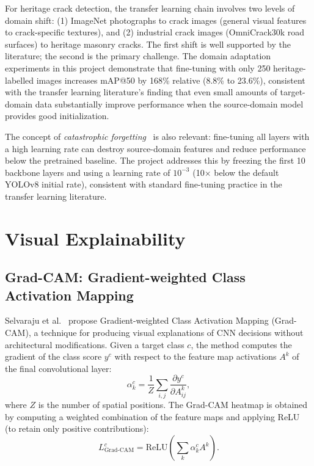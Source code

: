 \documentclass[12pt,a4paper]{article}
\begin{document}
For heritage crack detection, the transfer learning chain involves two levels of domain shift: (1) ImageNet photographs to crack images (general visual features to crack-specific textures), and (2) industrial crack images (OmniCrack30k road surfaces) to heritage masonry cracks. The first shift is well supported by the literature; the second is the primary challenge. The domain adaptation experiments in this project demonstrate that fine-tuning with only 250 heritage-labelled images increases mAP@50 by 168\% relative (8.8\% to 23.6\%), consistent with the transfer learning literature's finding that even small amounts of target-domain data substantially improve performance when the source-domain model provides good initialization.

The concept of \textit{catastrophic forgetting}~\cite{surv:mccloskey1989catastrophic} is also relevant: fine-tuning all layers with a high learning rate can destroy source-domain features and reduce performance below the pretrained baseline. The project addresses this by freezing the first 10 backbone layers and using a learning rate of $10^{-3}$ (10$\times$ below the default YOLOv8 initial rate), consistent with standard fine-tuning practice in the transfer learning literature.

\section{Visual Explainability}
\label{surv:sec:explain}

\subsection{Grad-CAM: Gradient-weighted Class Activation Mapping}

Selvaraju et al.~\cite{selvaraju2020gradcam} propose Gradient-weighted Class Activation Mapping (Grad-CAM), a technique for producing visual explanations of CNN decisions without architectural modifications. Given a target class $c$, the method computes the gradient of the class score $y^c$ with respect to the feature map activations $A^k$ of the final convolutional layer:
\begin{equation}
  \alpha_k^c = \frac{1}{Z} \sum_{i,j} \frac{\partial y^c}{\partial A^k_{ij}},
\end{equation}
where $Z$ is the number of spatial positions. The Grad-CAM heatmap is obtained by computing a weighted combination of the feature maps and applying ReLU (to retain only positive contributions):
\begin{equation}
  L_{\text{Grad-CAM}}^c = \text{ReLU}\!\left( \sum_k \alpha_k^c A^k \right).
\end{equation}
\end{document}
